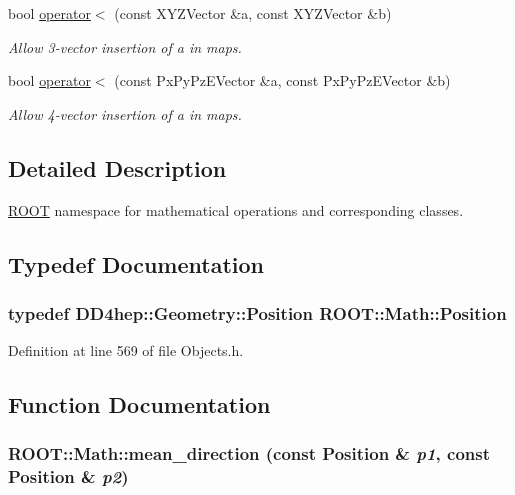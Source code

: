 \begin{DoxyCompactItemize}
bool \hyperlink{namespace_r_o_o_t_1_1_math_a3bf72adbd1dc8071ef0283f0e253974a}{operator$<$} (const XYZVector \&a, const XYZVector \&b)
\begin{DoxyCompactList}\small\item\em Allow 3-\/vector insertion of a in maps. \item\end{DoxyCompactList}\item 
bool \hyperlink{namespace_r_o_o_t_1_1_math_a1c3af6f88f23ab799472c3e6621364ea}{operator$<$} (const PxPyPzEVector \&a, const PxPyPzEVector \&b)
\begin{DoxyCompactList}\small\item\em Allow 4-\/vector insertion of a in maps. \item\end{DoxyCompactList}\end{DoxyCompactItemize}


\subsection{Detailed Description}
\hyperlink{namespace_r_o_o_t}{ROOT} namespace for mathematical operations and corresponding classes. 

\subsection{Typedef Documentation}
\hypertarget{namespace_r_o_o_t_1_1_math_ac2622efe8212cb8b8a8893efd5117de8}{
\subsubsection[{Position}]{\setlength{\rightskip}{0pt plus 5cm}typedef {\bf DD4hep::Geometry::Position} {\bf ROOT::Math::Position}}}
\label{namespace_r_o_o_t_1_1_math_ac2622efe8212cb8b8a8893efd5117de8}


Definition at line 569 of file Objects.h.

\subsection{Function Documentation}
\hypertarget{namespace_r_o_o_t_1_1_math_a06af24d8ff174f2f4d14850e63adc68f}{
\subsubsection[{mean\_\-direction}]{ ROOT::Math::mean\_\-direction (const Position \& {\em p1}, \/  const Position \& {\em p2})}}
\label{namespace_r_o_o_t_1_1_math_a06af24d8ff174f2f4d14850e63adc68f}


